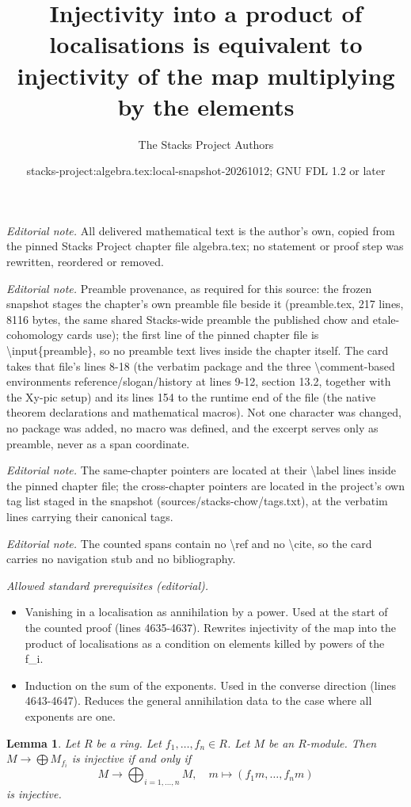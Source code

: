 \documentclass[10pt,a4paper]{amsart}
\title{Injectivity into a product of localisations is equivalent to injectivity of the map multiplying by the elements}
\author{The Stacks Project Authors}
\date{stacks-project:algebra.tex:local-snapshot-20261012; GNU FDL 1.2 or later}
\theoremstyle{plain}
\newtheorem{lemma}[subsection]{Lemma}
\theoremstyle{definition}
\theoremstyle{remark}
\numberwithin{equation}{subsection}
\begin{document}
\maketitle
\noindent\textit{Editorial note.} All delivered mathematical text is the author's own, copied from the pinned Stacks Project chapter file algebra.tex; no statement or proof step was rewritten, reordered or removed.\par\medskip
\noindent\textit{Editorial note.} Preamble provenance, as required for this source: the frozen snapshot stages the chapter's own preamble file beside it (preamble.tex, 217 lines, 8116 bytes, the same shared Stacks-wide preamble the published chow and etale-cohomology cards use); the first line of the pinned chapter file is \textbackslash{}input\{preamble\}, so no preamble text lives inside the chapter itself. The card takes that file's lines 8-18 (the verbatim package and the three \textbackslash{}comment-based environments reference/slogan/history at lines 9-12, section 13.2, together with the Xy-pic setup) and its lines 154 to the runtime end of the file (the native theorem declarations and mathematical macros). Not one character was changed, no package was added, no macro was defined, and the excerpt serves only as preamble, never as a span coordinate.\par\medskip
\noindent\textit{Editorial note.} The same-chapter pointers are located at their \textbackslash{}label lines inside the pinned chapter file; the cross-chapter pointers are located in the project's own tag list staged in the snapshot (sources/stacks-chow/tags.txt), at the verbatim lines carrying their canonical tags.\par\medskip
\noindent\textit{Editorial note.} The counted spans contain no \textbackslash{}ref and no \textbackslash{}cite, so the card carries no navigation stub and no bibliography.\par\medskip
\noindent\textit{Allowed standard prerequisites (editorial).}\begin{itemize}
\item Vanishing in a localisation as annihilation by a power. Used at the start of the counted proof (lines 4635-4637). Rewrites injectivity of the map into the product of localisations as a condition on elements killed by powers of the f\_i.
\item Induction on the sum of the exponents. Used in the converse direction (lines 4643-4647). Reduces the general annihilation data to the case where all exponents are one.
\end{itemize}\medskip
\begin{lemma}
\label{lemma-when-injective-covering}
Let $R$ be a ring.
Let $f_1, \ldots, f_n \in R$.
Let $M$ be an $R$-module.
Then $M \to \bigoplus M_{f_i}$ is injective if and only if
$$
M \longrightarrow \bigoplus\nolimits_{i = 1, \ldots, n} M, \quad
m \longmapsto (f_1m, \ldots, f_nm)
$$
is injective.
\end{lemma}
\end{document}
